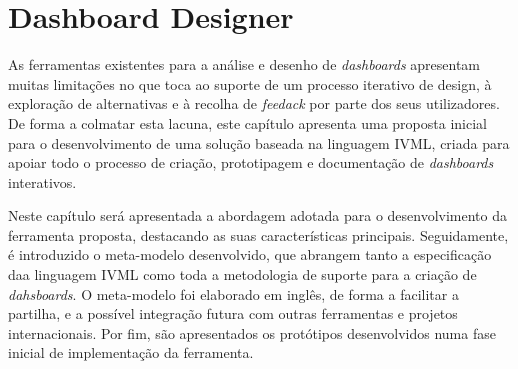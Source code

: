 
%

\chapter{Dashboard Designer}
\label{cha:dashboard_designer}



As ferramentas existentes para a análise e desenho de \textit{dashboards} apresentam muitas limitações no que toca ao suporte de um processo iterativo de design, à exploração de alternativas e à recolha de \textit{feedack} por parte dos seus utilizadores. De forma a colmatar esta lacuna, este capítulo apresenta uma proposta inicial para o desenvolvimento de uma solução baseada na linguagem \gls{IVML}, criada para apoiar todo o processo de criação, prototipagem e documentação de \textit{dashboards} interativos.

Neste capítulo será apresentada a abordagem adotada para o desenvolvimento da ferramenta proposta, destacando as suas características principais. Seguidamente, é introduzido o meta-modelo desenvolvido, que abrangem tanto a especificação daa linguagem \gls{IVML} como toda a metodologia de suporte para a criação de \textit{dahsboards}. O meta-modelo foi elaborado em inglês, de forma a facilitar a partilha, e a possível integração futura com outras ferramentas e projetos internacionais. Por fim, são apresentados os protótipos desenvolvidos numa fase inicial de implementação da ferramenta.

